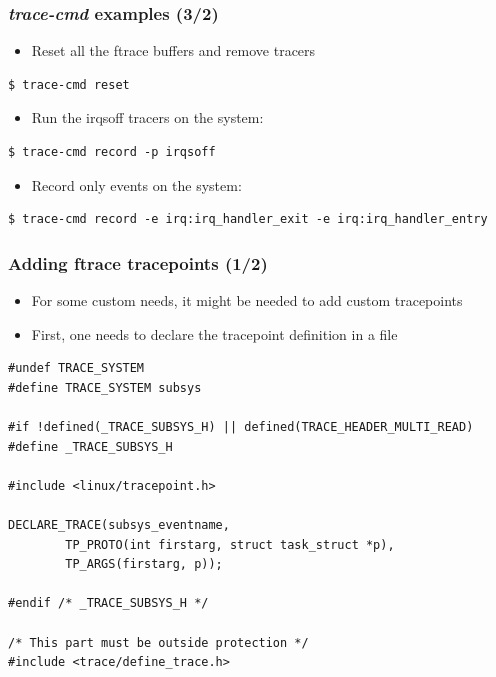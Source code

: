 \begin{frame}[fragile]
  \frametitle{{\em trace-cmd} examples (3/2)}
  \begin{itemize}
    \item Reset all the ftrace buffers and remove tracers
  \end{itemize}
  \begin{block}{}
    \begin{verbatim}
$ trace-cmd reset
    \end{verbatim}
  \end{block}

  \begin{itemize}
    \item Run the irqsoff tracers on the system:
  \end{itemize}
  \begin{block}{}
    \begin{verbatim}
$ trace-cmd record -p irqsoff
    \end{verbatim}
  \end{block}
  \begin{itemize}
    \item Record only  events on the
          system:
  \end{itemize}
  \begin{block}{}
    \begin{verbatim}
$ trace-cmd record -e irq:irq_handler_exit -e irq:irq_handler_entry
    \end{verbatim}
  \end{block}

\end{frame}

\begin{frame}[fragile]
  \frametitle{Adding ftrace tracepoints (1/2)}
  \begin{itemize}
    \item For some custom needs, it might be needed to add custom tracepoints
    \item First, one needs to declare the tracepoint definition in a 
          file
  \end{itemize}
  \begin{block}{}
    \begin{verbatim}
#undef TRACE_SYSTEM
#define TRACE_SYSTEM subsys

#if !defined(_TRACE_SUBSYS_H) || defined(TRACE_HEADER_MULTI_READ)
#define _TRACE_SUBSYS_H

#include <linux/tracepoint.h>

DECLARE_TRACE(subsys_eventname,
        TP_PROTO(int firstarg, struct task_struct *p),
        TP_ARGS(firstarg, p));

#endif /* _TRACE_SUBSYS_H */

/* This part must be outside protection */
#include <trace/define_trace.h>
    \end{verbatim}
  \end{block}
\end{frame}

